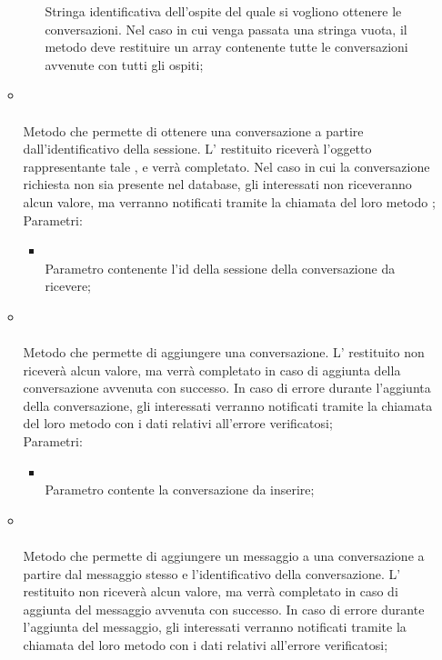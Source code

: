 \begin{itemize}
\begin{itemize}
\begin{itemize}
			Stringa identificativa dell'ospite del quale si vogliono ottenere le conversazioni. Nel caso in cui venga passata una stringa vuota, il metodo deve restituire un array contenente tutte le conversazioni avvenute con tutti gli ospiti;
		\end{itemize}
		\item[]  \\\\		Metodo che permette di ottenere una conversazione a partire dall'identificativo della sessione. L' restituito riceverà l'oggetto rappresentante tale , e verrà completato. Nel caso in cui la conversazione richiesta non sia presente nel database, gli  interessati non riceveranno alcun valore, ma verranno notificati tramite la chiamata del loro metodo ;\\
		Parametri:
		\begin{itemize}
			\item {} \\
			Parametro contenente l'id della sessione della conversazione da ricevere;
		\end{itemize}
		\item[]  \\\\		Metodo che permette di aggiungere una conversazione. L' restituito non riceverà alcun valore, ma verrà completato in caso di aggiunta della conversazione avvenuta con successo. In caso di errore durante l'aggiunta della conversazione, gli  interessati verranno notificati tramite la chiamata del loro metodo  con i dati relativi all'errore verificatosi;\\
		Parametri:
		\begin{itemize}
			\item {} \\
			Parametro contente la conversazione da inserire;
		\end{itemize}
		\item[] \\ \\		Metodo che permette di aggiungere un messaggio a una conversazione a partire dal messaggio stesso e l'identificativo della conversazione. L' restituito non riceverà alcun valore, ma verrà completato in caso di aggiunta del messaggio avvenuta con successo. In caso di errore durante l'aggiunta del messaggio, gli  interessati verranno notificati tramite la chiamata del loro metodo  con i dati relativi all'errore verificatosi;\\

\end{itemize}
\end{itemize}
